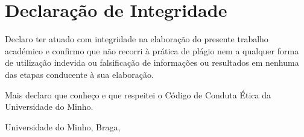 \chapter*{Declaração de Integridade}
\setlength{\parskip}{1em}
\noindent
Declaro ter atuado com integridade na elaboração do presente trabalho académico e confirmo que não recorri à prática de plágio nem a qualquer forma de utilização indevida ou falsificação de informações ou resultados em nenhuma das etapas conducente à sua elaboração.

\noindent
Mais declaro que conheço e que respeitei o Código de Conduta Ética da Universidade do Minho.


\phantom{space for signature}

\noindent
Universidade do Minho, Braga, \myear

\vspace{25mm}
\noindent\theauthor
\setlength{\parskip}{0em}